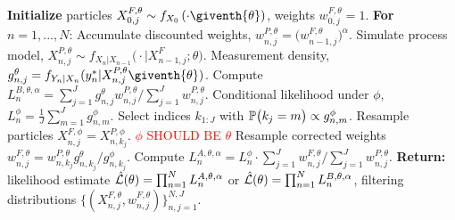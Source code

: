 \documentclass[9pt,twocolumn,twoside]{pnas-new}
\newcommand\ei[1]{\textcolor{red}{#1}}
\begin{document}
\begin{algorithm}[H]
		\textbf{Initialize } particles ${X}_{0,j}^{F,\theta}\sim {f}_{{X}_{0}}\left(\cdot\giventh{\theta}\right)$, weights $w^{F,\theta}_{0,j}= 1$. \newline
		\textbf{For} $n=1,...,N$: \newline
            \hspace*{4mm} Accumulate discounted weights, $w_{n,j}^{P,\theta} = \big(w_{n-1,j}^{F,\theta}\big)^\alpha$.\newline
            \hspace*{4mm} Simulate process model,
            ${X}_{n,j}^{P,\theta}\sim {f}_{{X}_{n}|{X}_{n-1}}\big(\cdot|{X}_{n-1,j}^{F};{\theta}\big)$. \newline
            \hspace*{4mm} Measurement density,
            $g^{\theta}_{n,j}={f}_{{Y}_{n}|{X}_{n}}(y_{n}^{*}|{X}_{n,j}^{P,\theta}\giventh{\theta})$. \newline
            \hspace*{4mm} Compute $L_n^{B,\theta,\alpha} ={\sum_{j=1}^Jg^\theta_{n,j} w^{P,\theta}_{n,j}}/{\sum_{j=1}^J  w^{P,\theta}_{n,j}}$. \newline
            \hspace*{4mm} Conditional likelihood under $\phi$,
            $L_n^{\phi} = \frac{1}{J}\sum_{m=1}^{J}g^{\phi}_{n,m}$.\newline
            \hspace*{4mm} Select indices $k_{1:J}$ with $\mathbb{P}\big(k_{j}=m\big) \propto g^{\phi}_{n,m}$. \newline
            \hspace*{4mm} Resample particles ${X}_{n,j}^{F,\phi}={X}_{n,k_{j}}^{P,\phi}$. \ei{$\phi$ SHOULD BE $\theta$} \newline
            \hspace*{4mm} Resample corrected weights
            $w_{n,j}^{F,\theta}= w^{P,\theta}_{n,k_j}  { g^{\theta}_{n,k_j}}/{ g^{\phi}_{n,k_j}}$.\newline
            \hspace*{4mm} Compute $ L_n^{A,\theta,\alpha} = L_n^\phi\cdot {\sum_{j=1}^J w^{F,\theta}_{n,j}}/{\sum_{j=1}^J  w^{P,\theta}_{n,j}}$.\newline
		\textbf{Return:} likelihood estimate $\hat{\mathcal{L}}(\theta) = \prod_{n=1}^N L_n^{A,\theta,\alpha}$ or $\hat{\mathcal{L}}(\theta) = \prod_{n=1}^N L_n^{B,\theta,\alpha}$, filtering distributions $\{(X_{n,j}^{F, \theta}, w^{F,\theta}_{n,j})\}_{n,j=1}^{N,J}.$
\end{algorithm}
\end{document}
